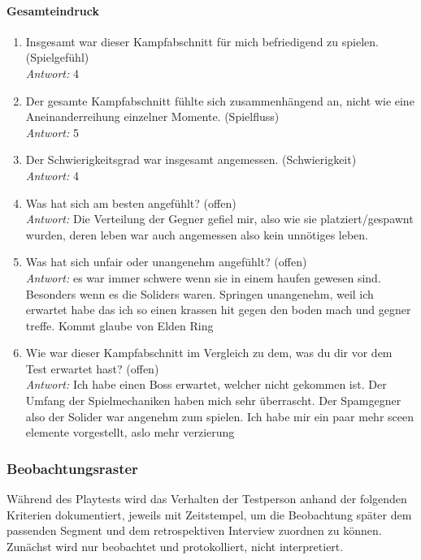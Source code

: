 \documentclass[../Main.tex]{subfiles}
\begin{document}
\paragraph{Gesamteindruck}
\begin{enumerate}[label=\textbf{Q\arabic*}, leftmargin=1.5cm, itemsep=0.8em, resume]
    \item Insgesamt war dieser Kampfabschnitt für mich befriedigend zu spielen. \hfill (Spielgefühl) \\
        \textit{Antwort:} 4
    \item Der gesamte Kampfabschnitt fühlte sich zusammenhängend an, nicht wie eine Aneinanderreihung einzelner Momente. \hfill (Spielfluss) \\
        \textit{Antwort:} 5
    \item Der Schwierigkeitsgrad war insgesamt angemessen. \hfill (Schwierigkeit) \\
        \textit{Antwort:} 4
    \item Was hat sich am besten angefühlt? \hfill (offen) \\
        \textit{Antwort:} Die Verteilung der Gegner gefiel mir, also wie sie platziert/gespawnt wurden, deren leben war auch angemessen also kein unnötiges leben.
    \item Was hat sich unfair oder unangenehm angefühlt? \hfill (offen) \\
        \textit{Antwort:} es war immer schwere wenn sie in einem haufen gewesen sind. Besonders wenn es die Soliders waren. Springen unangenehm, weil ich erwartet habe das ich so einen krassen hit gegen den boden mach und gegner treffe. Kommt glaube von Elden Ring
    \item Wie war dieser Kampfabschnitt im Vergleich zu dem, was du dir vor dem Test erwartet hast? \hfill (offen) \\
        \textit{Antwort:} Ich habe einen Boss erwartet, welcher nicht gekommen ist. Der Umfang der Spielmechaniken haben mich sehr überrascht. Der Spamgegner also der Solider war angenehm zum spielen. Ich habe mir ein paar mehr sceen elemente vorgestellt, aslo mehr verzierung
\end{enumerate}

\subsubsection{Beobachtungsraster}

Während des Playtests wird das Verhalten der Testperson anhand der folgenden Kriterien dokumentiert, jeweils mit Zeitstempel, um die Beobachtung später dem passenden Segment und dem retrospektiven Interview zuordnen zu können. Zunächst wird nur beobachtet und protokolliert, nicht interpretiert.
\end{document}
